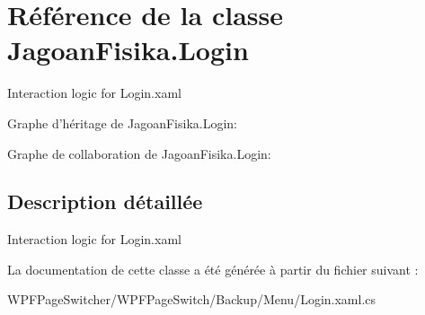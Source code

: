 \hypertarget{class_jagoan_fisika_1_1_login}{\section{Référence de la classe Jagoan\+Fisika.\+Login}
\label{class_jagoan_fisika_1_1_login}
}


Interaction logic for Login.\+xaml  




Graphe d'héritage de Jagoan\+Fisika.\+Login\+:


Graphe de collaboration de Jagoan\+Fisika.\+Login\+:


\subsection{Description détaillée}
Interaction logic for Login.\+xaml 



La documentation de cette classe a été générée à partir du fichier suivant \+:\begin{DoxyCompactItemize}
\item 
W\+P\+F\+Page\+Switcher/\+W\+P\+F\+Page\+Switch/\+Backup/\+Menu/Login.\+xaml.\+cs\end{DoxyCompactItemize}
